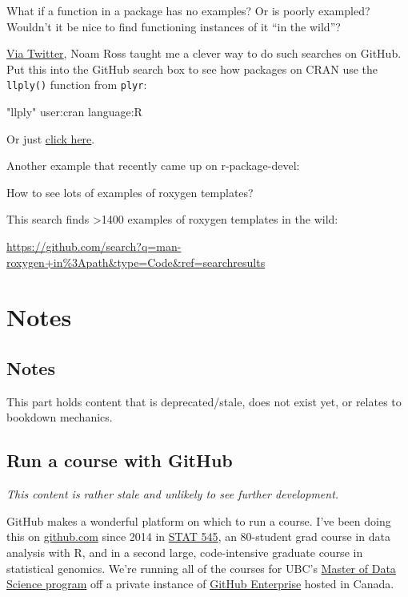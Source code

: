 \documentclass[
]{book}
\newenvironment{Shaded}{\begin{snugshade}}{\end{snugshade}}
\newcommand{\NormalTok}[1]{#1}
\newcommand{\StringTok}[1]{\textcolor[rgb]{0.31,0.60,0.02}{#1}}
\begin{document}
What if a function in a package has no examples? Or is poorly exampled? Wouldn't it be nice to find functioning instances of it ``in the wild''?

\href{https://twitter.com/noamross/status/563422536633839617}{Via Twitter}, Noam Ross taught me a clever way to do such searches on GitHub. Put this into the GitHub search box to see how packages on CRAN use the \texttt{llply()} function from \texttt{plyr}:

\begin{Shaded}
\begin{Highlighting}[]
\StringTok{"llply"}\NormalTok{ user:cran language:R}
\end{Highlighting}
\end{Shaded}

Or just \href{https://github.com/search?l=r&q=\%22llply\%22+user\%3Acran+language\%3AR&ref=searchresults&type=Code}{click here}.

Another example that recently came up on r-package-devel:

How to see lots of examples of roxygen templates?

This search finds \textgreater1400 examples of roxygen templates in the wild:

\url{https://github.com/search?q=man-roxygen+in\%3Apath&type=Code&ref=searchresults}

\part{Notes}\label{part-notes}

\chapter*{Notes}\label{notes-intro}

This part holds content that is deprecated/stale, does not exist yet, or relates to bookdown mechanics.

\chapter{Run a course with GitHub}\label{classroom-overview}

\emph{This content is rather stale and unlikely to see further development.}

GitHub makes a wonderful platform on which to run a course. I've been doing this on \href{https://github.com}{github.com} since 2014 in \href{http://stat545.com}{STAT 545}, an 80-student grad course in data analysis with R, and in a second large, code-intensive graduate course in statistical genomics. We're running all of the courses for UBC's \href{https://ubc-mds.github.io}{Master of Data Science program} off a private instance of \href{https://enterprise.github.com/home}{GitHub Enterprise} hosted in Canada.
\end{document}
